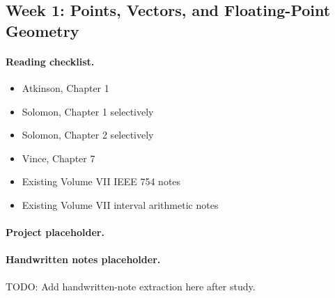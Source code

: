 \subsection{Week 1: Points, Vectors, and Floating-Point Geometry}

\paragraph{Reading checklist.}
\begin{itemize}
  \item Atkinson, Chapter 1
  \item Solomon, Chapter 1 selectively
  \item Solomon, Chapter 2 selectively
  \item Vince, Chapter 7
  \item Existing Volume VII IEEE 754 notes
  \item Existing Volume VII interval arithmetic notes
\end{itemize}

\paragraph{Project placeholder.}
\begingroup\small
{}
\endgroup

\paragraph{Handwritten notes placeholder.}
TODO: Add handwritten-note extraction here after study.
